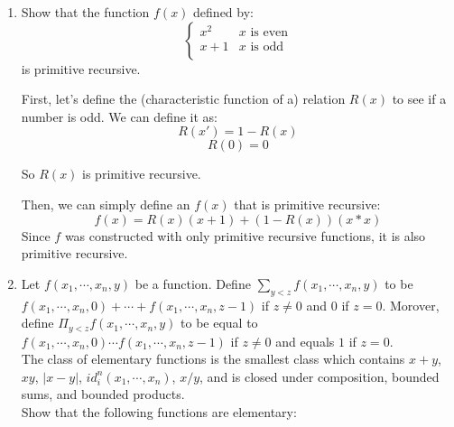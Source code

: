 
\usepackage{amsmath, dsfont, mathtools, verbatim, tikz, float, textcomp, mathrsfs}

\usetikzlibrary{arrows,automata}

\oddsidemargin 0in
\evensidemargin 0in
\textwidth 6.5in
\topmargin -0.5in
\textheight 9.0in
\newcommand{\norm}[1]{\left\lVert #1 \right\rVert}
\newcommand{\abs}[1]{\left\vert #1 \right\vert}
\newcommand{\?}{\stackrel{?}{=}}
\DeclarePairedDelimiter{\ceil}{\lceil}{\rceil}






\pagestyle{myheadings}

\begin{enumerate}
  \item 
    \begin{question}
      Show that the function $f(x)$ defined by:
      \[ \begin{cases} 
        x^2 & x \text{  is even}\\
        x+1 & x \text{  is odd}\\
      \end{cases}
      \]
      is primitive recursive.
    \end{question}

    First, let's define the (characteristic function of a) relation $R(x)$ to see if a number is odd. We can define it as:
    $$R(x') = 1 - R(x)$$
    $$R(0) = 0$$

    So $R(x)$ is primitive recursive.

    Then, we can simply define an $f(x)$ that is primitive recursive:
    $$f(x) = R(x)(x+1) + (1 - R(x))(x*x)$$
    Since $f$ was constructed with only primitive recursive functions, it is also primitive recursive.
  \item
    \begin{question}
      Let $f(x_1,\cdots,x_n,y)$ be a function. Define $\sum_{y < z} f(x_1,\cdots,x_n,y)$ to be $f(x_1,\cdots,x_n,0) + \cdots + f(x_1,\cdots,x_n,z-1)$ if $z \neq 0$ and $0$ if $z=0$. Morover, define $\Pi_{y<z} f(x_1,\cdots,x_n,y)$ to be equal to $f(x_1,\cdots,x_n,0) \cdots f(x_1,\cdots,x_n,z-1)$ if $z \neq 0$ and equals $1$ if $z=0$.\\
      The class of elementary functions is the smallest class which contains $x+y$, $xy$, $\abs{x-y}$, $id^{n}_{i}(x_1,\cdots,x_n)$, $x/y$, and is closed under composition, bounded sums, and bounded products.\\
      Show that the following functions are elementary:
    \end{question}


\end{enumerate}
